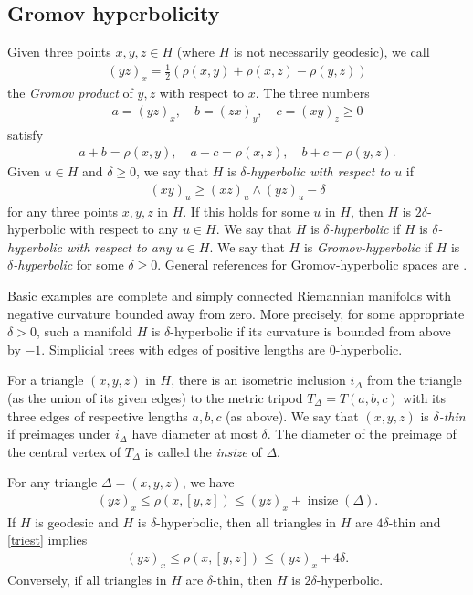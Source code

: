 \documentclass[12pt,a4paper]{amsart}
\numberwithin{equation}{section}
\theoremstyle{definition}
\DeclareMathOperator{\insize}{insize}
\begin{document}
\subsection{Gromov hyperbolicity}\label{subgrohyp}
Given three points $x,y,z\in H$ (where $H$ is not necessarily geodesic), we call
\begin{align}\label{grpr}
    (yz)_x = \frac12(\rho(x,y) + \rho(x,z) - \rho(y,z)) 
\end{align}
the \emph{Gromov product} of $y,z$ with respect to $x$.
The three numbers
\begin{align*}
	a=(yz)_x, \quad b=(zx)_y, \quad c=(xy)_z \ge 0
\end{align*}
satisfy
\begin{align*}
    a+b=\rho(x,y), \quad a+c = \rho(x,z), \quad b+c = \rho(y,z).
\end{align*}
Given $u\in H$ and $\delta\ge0$, we say that $H$ is \emph{$\delta$-hyperbolic with respect to $u$} if
\begin{align}\label{grohyp}
    (xy)_u \ge (xz)_u\wedge(yz)_u - \delta     
\end{align}
for any three points $x,y,z$ in $H$.
If this holds for some $u$ in $H$, then $H$ is $2\delta$-hyperbolic with respect to any $u\in H$.
We say that $H$ is \emph{$\delta$-hyperbolic} if $H$ is \emph{$\delta$-hyperbolic with respect to any $u\in H$}.
We say that $H$ is \emph{Gromov-hyperbolic} if $H$ is \emph{$\delta$-hyperbolic} for some $\delta\ge0$.
General references for Gromov-hyperbolic spaces are \cite{Gro,GH,BriHae}.

Basic examples are complete and simply connected Riemannian manifolds with negative curvature bounded away from zero.
More precisely, for some appropriate $\delta>0$, such a manifold $H$ is $\delta$-hyperbolic if its  curvature is bounded from above by $-1$.
Simplicial trees with edges of positive lengths are $0$-hyperbolic. 

For a triangle $(x,y,z)$ in $H$, there is an isometric inclusion $i_\Delta$ from the triangle (as the union of its given edges) to the metric tripod $T_\Delta=T(a,b,c)$ with its three edges of respective lengths $a,b,c$ (as above).
We say that $(x,y,z)$ is \emph{$\delta$-thin} if preimages under $i_\Delta$ have diameter at most $\delta$.
The diameter of the preimage of the central vertex of $T_\Delta$ is called the \emph{insize} of $\Delta$.

For any triangle $\Delta=(x,y,z)$, we have
\begin{align}\label{triest}
	(yz)_x \le \rho(x,[y,z]) \le (yz)_x+\insize(\Delta).
\end{align}
If $H$ is geodesic and $H$ is $\delta$-hyperbolic, then all triangles in $H$ are $4\delta$-thin and \eqref{triest} implies
\begin{align}
	(yz)_x \le \rho(x,[y,z]) \le (yz)_x+4\delta.
\end{align}
Conversely, if all triangles in $H$ are $\delta$-thin, then $H$ is $2\delta$-hyperbolic.
\end{document}
